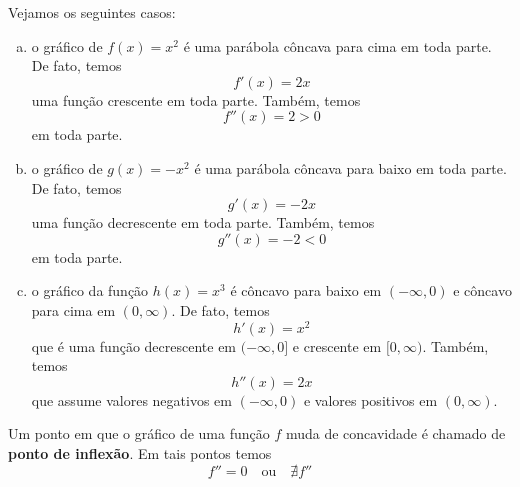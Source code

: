 \cleardoublepage\documentclass[../main.tex]{subfiles}
\begin{document}
\begin{ex}
  Vejamos os seguintes casos:
  \begin{enumerate}[a)]
  \item o gráfico de $f(x) = x^2$ é uma parábola côncava para cima em toda parte. De fato, temos
    \begin{equation*}
      f'(x) = 2x
    \end{equation*}
    uma função crescente em toda parte. Também, temos
    \begin{equation*}
      f''(x) = 2 > 0
    \end{equation*}
    em toda parte.
  \item o gráfico de $g(x) = -x^2$ é uma parábola côncava para baixo em toda parte. De fato, temos
    \begin{equation*}
      g'(x) = -2x
    \end{equation*}
    uma função decrescente em toda parte. Também, temos
    \begin{equation*}
      g''(x) = -2 < 0
    \end{equation*}
    em toda parte.
  \item o gráfico da função $h(x) = x^3$ é côncavo para baixo em $(-\infty, 0)$ e côncavo para cima em $(0, \infty)$. De fato, temos
    \begin{equation*}
      h'(x) = x^2
    \end{equation*}
    que é uma função decrescente em $(-\infty, 0]$ e crescente em $[0, \infty)$. Também, temos
    \begin{equation*}
      h''(x) = 2x
    \end{equation*}
    que assume valores negativos em $(-\infty, 0)$ e valores positivos em $(0, \infty)$.
  \end{enumerate}
\end{ex}

Um ponto em que o gráfico de uma função $f$ muda de concavidade é chamado de {\bf ponto de inflexão}. Em tais pontos temos
\begin{equation*}
  f'' = 0\quad\text{ou}\quad\nexists f''
\end{equation*}
\end{document}
